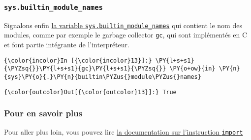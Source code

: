     \hypertarget{sys.builtin_module_names}{%
\subsubsection{\texorpdfstring{\texttt{sys.builtin\_module\_names}}{sys.builtin\_module\_names}}\label{sys.builtin_module_names}}

    Signalons enfin
\href{https://docs.python.org/3/library/sys.html\#sys.builtin_module_names}{la
variable \texttt{sys.builtin\_module\_names}} qui contient le nom des
modules, comme par exemple le garbage collector \texttt{gc}, qui sont
implémentés en C et font partie intégrante de l'interpréteur.

    \begin{Verbatim}[commandchars=\\\{\}]
{\color{incolor}In [{\color{incolor}13}]:} \PY{l+s+s1}{\PYZsq{}}\PY{l+s+s1}{gc}\PY{l+s+s1}{\PYZsq{}} \PY{o+ow}{in} \PY{n}{sys}\PY{o}{.}\PY{n}{builtin\PYZus{}module\PYZus{}names}
\end{Verbatim}


\begin{Verbatim}[commandchars=\\\{\}]
{\color{outcolor}Out[{\color{outcolor}13}]:} True
\end{Verbatim}
            
    \hypertarget{pour-en-savoir-plus}{%
\subsubsection{Pour en savoir plus}\label{pour-en-savoir-plus}}

    Pour aller plus loin, vous pouvez lire
\href{https://docs.python.org/3/reference/simple_stmts.html\#the-import-statement}{la
documentation sur l'instruction \texttt{import}}